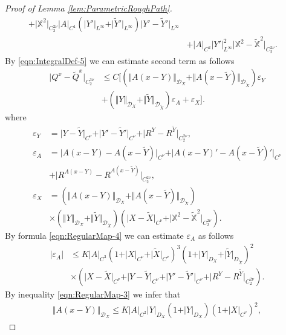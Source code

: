 \documentclass[11pt,a4paper,leqno]{amsart}%
\theoremstyle{plain}
\theoremstyle{remark}
\theoremstyle{plain}
\numberwithin{equation}{section}
\newcommand{\eps}{\varepsilon}
\begin{document}
\begin{proof}[ Proof of Lemma \ref{lem:ParametricRoughPath}]
\begin{align}
+\vert \mathbb{X}^2\vert_{C_2^{2\nu}}\vert A\vert_{C^1}(\vert Y'\vert_{L^{\infty}}+\vert \tilde{Y}'\vert_{L^{\infty}})\vert Y'-\tilde{Y}'\vert_{L^{\infty}}\nonumber\\
&+\vert A\vert_{C^2}\vert Y'\vert_{L^{\infty}}^2\vert \mathbb{X}^2-\mathbb{\tilde{X}}^2\vert_{C_2^{2\nu}}.\quad\nonumber
\end{align}
By \eqref{eqn:IntegralDef-5} we can estimate second term as
follows
\begin{equation}
\label{eqn:PRaux-3}
\begin{aligned}
\vert Q^x-\tilde{Q}^x\vert_{C_2^{3\nu}}&\leq
C\Big[(\Vert A(x-Y)\Vert_{\mathcal{D}_X}+\Vert A(x-\tilde{Y})\Vert_{\mathcal{D}_{\tilde{X}}})\eps_Y\nonumber\\
&+
(\Vert Y\Vert_{\mathcal{D}_X}+\Vert \tilde{Y}\Vert_{\mathcal{D}_{\tilde{X}}})\eps_A+\eps_X\Big].
\end{aligned}
\end{equation}
where
\begin{align*}
\eps_Y&=\vert Y-\tilde{Y}\vert_{C^{\nu}}+\vert Y'-\tilde{Y}'\vert_{C^{\nu}}+\vert R^Y-R^{\tilde{Y}}\vert_{C_2^{2\nu}},\\
\eps_A&=\vert A(x-Y)-A(x-\tilde{Y})\vert_{C^{\nu}}+\vert A(x-Y)'-A(x-\tilde{Y})'\vert_{C^{\nu}}\\
&+\vert R^{A(x-Y)}-R^{A(x-\tilde{Y})}\vert_{C_2^{2\nu}},\\
\eps_X&=(\Vert A(x-Y)\Vert_{\mathcal{D}_X}+\Vert A(x-\tilde{Y})\Vert_{\mathcal{D}_{\tilde{X}}})\\
&\times(\Vert Y\Vert_{\mathcal{D}_X}+\Vert \tilde{Y}\Vert_{\mathcal{D}_{\tilde{X}}})
(\vert X-\tilde{X}\vert_{C^{\nu}}+\vert \mathbb{X}^2-\mathbb{\tilde{X}}^2\vert_{C_2^{2\nu}}).
\end{align*}
By formula \eqref{eqn:RegularMap-4} we can estimate $\eps_A$ as
follows
\begin{align}
\vert \eps_A\vert &\leq
K\vert A\vert_{C^3}(1+\vert X\vert_{C^{\nu}}+\vert \tilde{X}\vert_{C^{\nu}})^3(1+\vert Y\vert_{D_X}+\vert \tilde{Y}\vert_{D_{\tilde{X}}})^2\nonumber\\
&\times(\vert X-\tilde{X}\vert_{C^{\nu}}+\vert Y-\tilde{Y}\vert_{C^{\nu}}+\vert Y'-\tilde{Y}'\vert_{C^{\nu}}+\vert R^Y-R^{\tilde{Y}}\vert_{C_2^{2\nu}}).\label{eqn:PRaux-4}
\end{align}
By inequality \eqref{eqn:RegularMap-3} we infer that
\begin{eqnarray}
\Vert A(x-Y)\Vert_{\mathcal{D}_X}\leq
K\vert A\vert_{C^2}\vert Y\vert_{D_X}(1+\vert Y\vert_{D_X})(1+\vert X\vert_{C^{\nu}})^2,\label{eqn:PRaux-5}

\end{eqnarray}
\end{proof}
\end{document}

